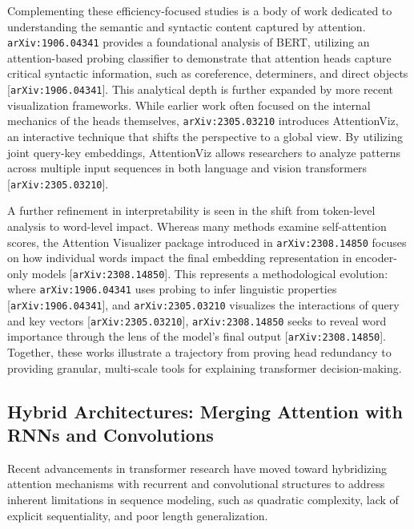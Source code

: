 \documentclass[11pt]{article}
\begin{document}
Complementing these efficiency-focused studies is a body of work dedicated to understanding the semantic and syntactic content captured by attention. \texttt{arXiv:1906.04341} provides a foundational analysis of BERT, utilizing an attention-based probing classifier to demonstrate that attention heads capture critical syntactic information, such as coreference, determiners, and direct objects [\texttt{arXiv:1906.04341}]. This analytical depth is further expanded by more recent visualization frameworks. While earlier work often focused on the internal mechanics of the heads themselves, \texttt{arXiv:2305.03210} introduces AttentionViz, an interactive technique that shifts the perspective to a global view. By utilizing joint query-key embeddings, AttentionViz allows researchers to analyze patterns across multiple input sequences in both language and vision transformers [\texttt{arXiv:2305.03210}].

A further refinement in interpretability is seen in the shift from token-level analysis to word-level impact. Whereas many methods examine self-attention scores, the Attention Visualizer package introduced in \texttt{arXiv:2308.14850} focuses on how individual words impact the final embedding representation in encoder-only models [\texttt{arXiv:2308.14850}]. This represents a methodological evolution: where \texttt{arXiv:1906.04341} uses probing to infer linguistic properties [\texttt{arXiv:1906.04341}], and \texttt{arXiv:2305.03210} visualizes the interactions of query and key vectors [\texttt{arXiv:2305.03210}], \texttt{arXiv:2308.14850} seeks to reveal word importance through the lens of the model's final output [\texttt{arXiv:2308.14850}]. Together, these works illustrate a trajectory from proving head redundancy to providing granular, multi-scale tools for explaining transformer decision-making.

\subsection{Hybrid Architectures: Merging Attention with RNNs and Convolutions}

Recent advancements in transformer research have moved toward hybridizing attention mechanisms with recurrent and convolutional structures to address inherent limitations in sequence modeling, such as quadratic complexity, lack of explicit sequentiality, and poor length generalization.
\end{document}
